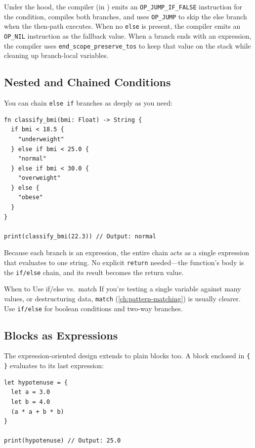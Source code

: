 Under the hood, the compiler (in ) emits an \lstinline|OP_JUMP_IF_FALSE| instruction for the condition, compiles both branches, and uses \lstinline|OP_JUMP| to skip the else branch when the then-path executes. When no \lstinline|else| is present, the compiler emits an \lstinline|OP_NIL| instruction as the fallback value. When a branch ends with an expression, the compiler uses \texttt{end\_scope\_preserve\_tos} to keep that value on the stack while cleaning up branch-local variables.

\subsection{Nested and Chained Conditions}\label{sec:chained-if}

You can chain \lstinline|else if| branches as deeply as you need:

\begin{lstlisting}[language=Lattice, caption={Chained else if}]
fn classify_bmi(bmi: Float) -> String {
  if bmi < 18.5 {
    "underweight"
  } else if bmi < 25.0 {
    "normal"
  } else if bmi < 30.0 {
    "overweight"
  } else {
    "obese"
  }
}

print(classify_bmi(22.3)) // Output: normal
\end{lstlisting}

Because each branch is an expression, the entire chain acts as a single expression that evaluates to one string. No explicit \lstinline|return| needed---the function's body is the \lstinline|if/else| chain, and its result becomes the return value.

\begin{tipbox}{When to Use if/else vs.\ match}
If you're testing a single variable against many values, or destructuring data, \lstinline|match| (\cref{ch:pattern-matching}) is usually clearer. Use \lstinline|if/else| for boolean conditions and two-way branches.
\end{tipbox}

\subsection{Blocks as Expressions}\label{sec:blocks-as-expressions}

The expression-oriented design extends to plain blocks too. A block enclosed in \lstinline|{ }| evaluates to its last expression:

\begin{lstlisting}[language=Lattice, caption={Block expressions}]
let hypotenuse = {
  let a = 3.0
  let b = 4.0
  (a * a + b * b)
}

print(hypotenuse) // Output: 25.0
\end{lstlisting}

